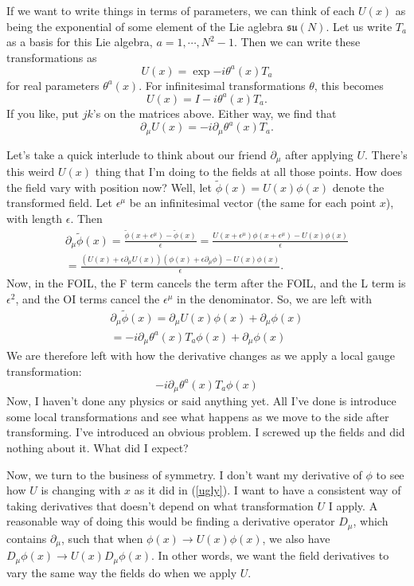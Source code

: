 \documentclass[main.tex]{subfiles}
\begin{document}
If we want to write things in terms of parameters, we can think of each $U(x)$ as being the exponential of some element of the Lie aglebra $\mathfrak{su} (N)$. Let us write $T_a$ as a basis for this Lie algebra, $a = 1,\cdots, N^2 -1$. Then we can write these transformations as
\[
U(x) = \exp{- i \theta^a (x) T_a}
\]
for real parameters $\theta^a (x)$. For infinitesimal transformations $\theta$, this becomes
\[
U(x) = I - i \theta^a (x) T_a.
\]
If you like, put $jk$'s on the matrices above. Either way, we find that 
\[
\partial_\mu U (x) = -i \partial_\mu \theta^a (x) T_a.
\]

Let's take a quick interlude to think about our friend $\partial_\mu$ after applying $U$. There's this weird $U(x)$ thing that I'm doing to the fields at all those points. How does the field vary with position now? Well, let $\tilde{\phi}(x) = U (x) \phi(x)$ denote the transformed field. Let $\epsilon^\mu$ be an infinitesimal vector (the same for each point $x$), with length $\epsilon$. Then
\begin{align*}
\partial_\mu \tilde{\phi} (x) =
\frac{\tilde{\phi} (x + \epsilon^\mu) - \tilde{\phi}(x)}{\epsilon} = 
\frac{U(x + \epsilon^\mu) \phi(x + \epsilon^\mu) - U(x) \phi(x)}{\epsilon} \\ =
\frac{\left( U (x) + \epsilon \partial_\mu U (x)\right) \left(\phi(x) + \epsilon \partial_\mu \phi \right) - U(x) \phi(x)}{\epsilon}.
\end{align*}
Now, in the FOIL, the F term cancels the term after the FOIL, and the L term is $\epsilon^2$, and the OI terms cancel the $\epsilon^\mu$ in the denominator. So, we are left with
\begin{align*}
\partial_\mu \tilde{\phi} (x) = \partial_\mu U (x) \phi(x) + \partial_\mu \phi (x) \\ =
-i \partial_\mu \theta^a (x) T_a \phi(x) + \partial_\mu \phi (x)
\end{align*}
We are therefore left with how the derivative changes as we apply a local gauge transformation:
\begin{equation} \label{ugly}
-i \partial_\mu \theta^a (x) T_a \phi(x) 
\end{equation}
Now, I haven't done any physics or said anything yet. All I've done is introduce some local transformations and see what happens as we move to the side after transforming. I've introduced an obvious problem. I screwed up the fields and did nothing about it. What did I expect?

Now, we turn to the business of symmetry. I don't want my derivative of $\phi$ to see how $U$ is changing with $x$ as it did in (\ref{ugly}). I want to have a consistent way of taking derivatives that doesn't depend on what transformation $U$ I apply. A reasonable way of doing this would be finding a derivative operator $D_\mu$, which contains $\partial_\mu$, such that when $\phi (x) \to U(x) \phi(x)$, we also have $D_\mu \phi(x) \to U(x) D_\mu \phi(x)$. In other words, we want the field derivatives to vary the same way the fields do when we apply $U$.
\end{document}
